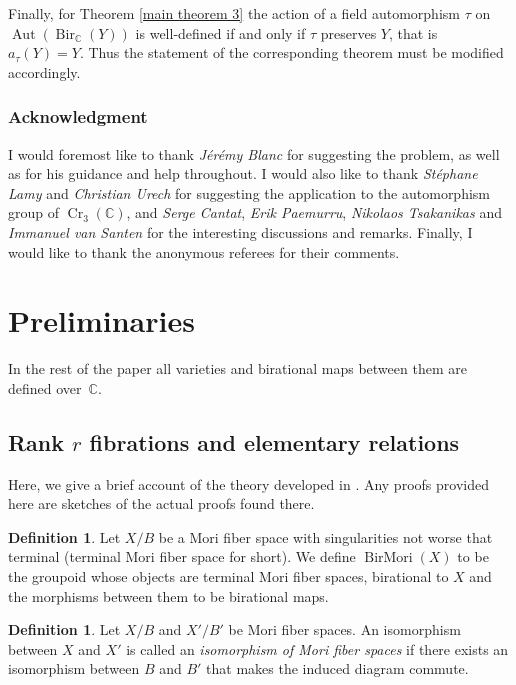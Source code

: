 \documentclass[JEP,XML,SOM,Unicode,published]{cedram}
\theoremstyle{plain}
\theoremstyle{definition}
\newtheorem{definition}[theorem]{Definition}
\newcommand\Aut{\operatorname{Aut}}
\newcommand\Bir{\operatorname{Bir}}
\newcommand\BirMori{\operatorname{BirMori}}
\newcommand\Cr{\operatorname{Cr}}
\newcommand{\CC}{\mathbb{C}}
\begin{document}
Finally, for Theorem \ref{main theorem 3} the action of a field automorphism $\tau$ on $\Aut(\Bir_{\CC}(Y))$ is well-defined if and only if $\tau$ preserves $Y$, that is $a_{\tau}(Y) = Y$. Thus the statement of the corresponding theorem must be modified accordingly.

\subsubsection*{Acknowledgment}I would foremost like to thank \emph{Jérémy Blanc} for suggesting the problem, as well as for his guidance and help throughout. I would also like to thank \emph{Stéphane Lamy} and \emph{Christian Urech} for suggesting the application to the automorphism group of $\Cr_3(\CC)$, and \emph{Serge Cantat}, \emph{Erik Paemurru}, \emph{Nikolaos Tsakanikas} and \emph{Immanuel van Santen} for the interesting discussions and remarks.
Finally, I would like to thank the anonymous referees for their comments.

\section{Preliminaries}

In the rest of the paper all varieties and birational maps between them are defined over~$\CC$.

\subsection{Rank $r$ fibrations and elementary relations}

Here, we give a brief account of the theory developed in \cite[\S\S 3 \& 4]{BLZ}. Any proofs provided here are sketches of the actual proofs found there.

\begin{definition}
Let $X/B$ be a Mori fiber space with singularities not worse that terminal (terminal Mori fiber space for short). We define $\BirMori(X)$ to be the groupoid whose objects are terminal Mori fiber spaces, birational to $X$ and the morphisms between them to be birational maps.
\end{definition}

\begin{definition}
Let $X/B$ and $X'/B'$ be Mori fiber spaces. An isomorphism between $X$ and $X'$ is called an \emph{isomorphism of Mori fiber spaces} if there exists an isomorphism between $B$ and $B'$ that makes the induced diagram commute.
\end{definition}
\end{document}
